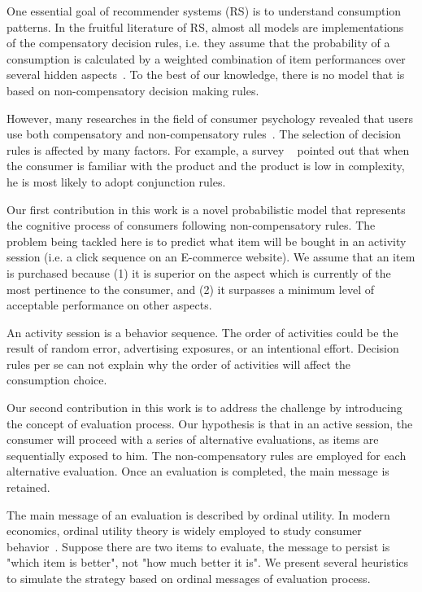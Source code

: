 \documentclass[sigconf]{acmart}
\begin{document}
One essential goal of recommender systems (RS) is to understand consumption patterns. In the fruitful literature of RS, almost all models are implementations of the compensatory decision rules, i.e. they assume that the probability of a consumption is calculated by a weighted combination of item performances over several hidden aspects~\cite{Gopalan2015Scalable,Hu2008Collaborative}. To the best of our knowledge, there is no model that is based on non-compensatory decision making rules.


However, many researches in the field of consumer psychology revealed that users use both compensatory and non-compensatory rules~\cite{Engel1986Consumer}. The selection of decision rules is affected by many factors. For example, a survey ~\cite{Park1976Effect} pointed out that when the consumer is familiar with the product and the product is low in complexity, he is most likely to adopt conjunction rules.




Our first contribution in this work is a novel probabilistic model that represents the cognitive process of consumers following non-compensatory rules. The problem being tackled here is to predict what item will be bought  in an activity session (i.e. a click sequence on an E-commerce website). We assume that an item is purchased because (1) it is superior on the aspect which is currently of the most pertinence to the consumer, and (2) it surpasses a minimum level of acceptable performance on other aspects.


An activity session is a behavior sequence. The order of activities could be the result of random error,  advertising exposures, or an intentional effort. Decision rules per se can not explain why the order of activities will affect the consumption choice.


Our second contribution in this work is to address the challenge by introducing the concept of evaluation  process. Our hypothesis is that in an active session, the consumer will proceed with a series of alternative evaluations, as items are sequentially exposed to him. The non-compensatory rules are employed for each alternative evaluation. Once an evaluation is completed, the main message is retained.  

The main message of an evaluation is described by ordinal utility. In modern economics, ordinal utility theory is widely employed to study consumer behavior~\cite{Simon1959Theories}. Suppose there are two items to evaluate, the message to  persist is "which item is better", not "how much better it is". We present several heuristics to simulate the strategy based on ordinal messages of evaluation process.
\end{document}
